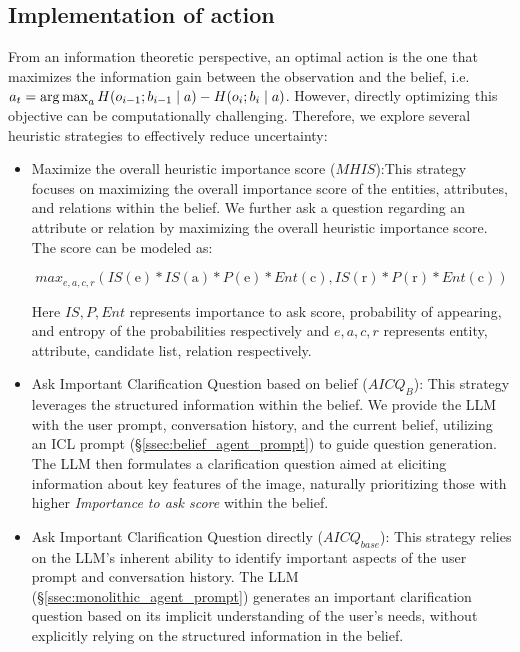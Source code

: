 \subsection{Implementation of action} \label{sssec:action_implementation}

From an information theoretic perspective, an optimal action is the one that maximizes the information gain between the observation and the belief, i.e. $a_t = \operatorname*{arg\,max}_a H(o_{i-1}; b_{i-1} \mid a) - H(o_{i}; b_{i} \mid a)$. However, directly optimizing this objective can be computationally challenging. Therefore, we explore several heuristic strategies to effectively reduce uncertainty: 
\begin{itemize}
    \item Maximize the overall heuristic importance score ($MHIS$):This strategy focuses on maximizing the overall importance score of the entities, attributes, and relations within the belief. We further ask a question regarding an attribute or relation by maximizing the overall heuristic importance score. The score can be modeled as: 

\begin{equation} \label{eq:importance_score}
max_{e, a, c, r}( IS(\text{e})*IS(\text{a})*P(\text{e})*Ent(\text{c}), IS(\text{r})*P(\text{r})*Ent(\text{c}))
\end{equation}


Here $IS, P, Ent$ represents importance to ask score, probability of appearing, and entropy of the probabilities respectively and $e, a, c, r$ represents entity, attribute, candidate list, relation respectively.
    \item Ask Important Clarification Question based on belief ($AICQ_{B}$): This strategy leverages the structured information within the belief. We provide the LLM with the user prompt, conversation history, and the current belief, utilizing an ICL prompt (\S\ref{ssec:belief_agent_prompt}) to guide question generation. The LLM then formulates a clarification question aimed at eliciting information about key features of the image, naturally prioritizing those with higher \textit{Importance to ask score} within the belief.
    \item Ask Important Clarification Question directly ($AICQ_{base}$): This strategy relies on the LLM's inherent ability to identify important aspects of the user prompt and conversation history. The LLM (\S\ref{ssec:monolithic_agent_prompt}) generates an important clarification question based on its implicit understanding of the user's needs, without explicitly relying on the structured information in the belief.
\end{itemize}

